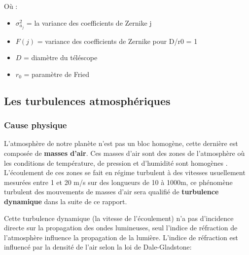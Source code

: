 Où :
\begin{itemize}
  \item $\sigma_{a_j}^2$ = la variance des coefficients de Zernike j
  \item  $F(j)$ = variance des coefficients de Zernike pour D/r0 = 1
  \item $D$ = diamètre du téléscope
  \item $r_0$ = paramètre de Fried
\end{itemize}

\subsection{Les turbulences atmosphériques}

\subsubsection{Cause physique}
L'atmosphère de notre planète n'est pas un bloc homogène, cette dernière est composée de \textbf{masses d'air}. Ces masses d'air
sont des zones de l'atmosphère où les conditions de température, de pression et d'humidité sont homogènes \cite{masse_air_wiki}\cite{masse_air_unige}.
L'écoulement de ces zones se fait en régime turbulent à des vitesses usuellement mesurées entre 1 et 20 m/s sur des longueurs de 10 à 1000m, ce phénomène
turbulent des mouvements de masses d'air sera qualifié de \textbf{turbulence dynamique} dans la suite de ce rapport.

Cette turbulence dynamique (la vitesse de l'écoulement) n'a pas d'incidence directe sur la propagation des ondes lumineuses, seul l'indice de réfraction de l'atmosphère influence la propagation
de la lumière. L'indice de réfraction est influencé par la densité de l'air selon la loi de Dale-Gladstone:



